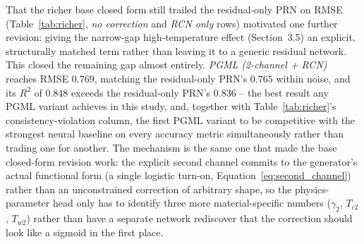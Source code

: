 \documentclass[11pt]{article}
\begin{document}
That the richer base closed form still trailed the residual-only PRN on RMSE (Table~\ref{tab:richer}, \emph{no correction} and \emph{RCN only} rows) motivated one further revision: giving the narrow-gap high-temperature effect (Section~3.5) an explicit, structurally matched term rather than leaving it to a generic residual network. This closed the remaining gap almost entirely. \emph{PGML (2-channel + RCN)} reaches RMSE $0.769$, matching the residual-only PRN's $0.765$ within noise, and its $R^2$ of $0.848$ exceeds the residual-only PRN's $0.836$ -- the best result any PGML variant achieves in this study, and, together with Table~\ref{tab:richer}'s consistency-violation column, the first PGML variant to be competitive with the strongest neural baseline on every accuracy metric simultaneously rather than trading one for another. The mechanism is the same one that made the base closed-form revision work: the explicit second channel commits to the generator's actual functional form (a single logistic turn-on, Equation~\ref{eq:second_channel}) rather than an unconstrained correction of arbitrary shape, so the physics-parameter head only has to identify three more material-specific numbers ($\gamma_2$, $T_{c2}$, $T_{w2}$) rather than have a separate network rediscover that the correction should look like a sigmoid in the first place.
\end{document}
